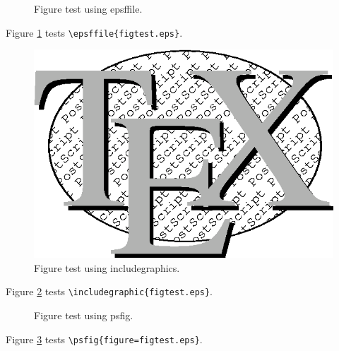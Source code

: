 \documentclass{article}
\begin{document}
\begin{figure}
\caption{Figure test using epsffile.} 
\label{figure1}
\end{figure}

Figure \ref{figure1} tests \verb#\epsffile{figtest.eps}#.

\begin{figure}
\includegraphics{figtest.eps}
\caption{Figure test using includegraphics.} 
\label{figure2}
\end{figure}

Figure \ref{figure2} tests \verb#\includegraphic{figtest.eps}#.

\begin{figure}
\caption{Figure test using psfig.} 
\label{figure3}
\end{figure}

Figure \ref{figure3} tests \verb#\psfig{figure=figtest.eps}#.
\end{document}
